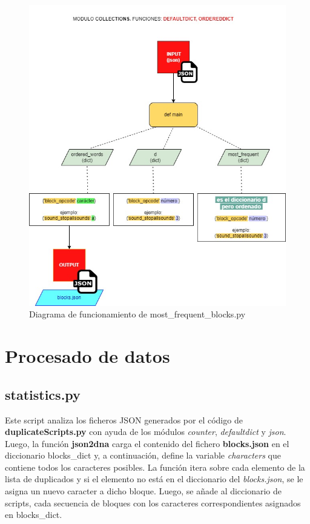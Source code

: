 \documentclass[a4paper, 12pt]{book}
\begin{document}
\begin{figure}[!htb]
  \centering
  \includegraphics[width=15cm, keepaspectratio]{img/flow_mostfreq.jpg}
  \caption{Diagrama de funcionamiento de most\_frequent\_blocks.py}
  \label{fig:flow_mostfreq}
\end{figure}

\newpage 

\section{Procesado de datos} 
\label{sec:procesadodatos}

\subsection{statistics.py}

Este script analiza los ficheros JSON generados por el código de \textbf{duplicateScripts.py} con ayuda de los módulos \textit{counter}, \textit{defaultdict} y \textit{json}. Luego, la función \textbf{json2dna} carga el contenido del fichero \textbf{blocks.json} en el diccionario blocks\_dict y, a continuación, define la variable \textit{characters} que contiene todos los caracteres posibles. La función itera sobre cada elemento de la lista de duplicados y si el elemento no está en el diccionario del \textit{blocks.json}, se le asigna un nuevo caracter a dicho bloque. Luego, se añade al diccionario de scripts, cada secuencia de bloques con los caracteres correspondientes asignados en blocks\_dict.
\end{document}
